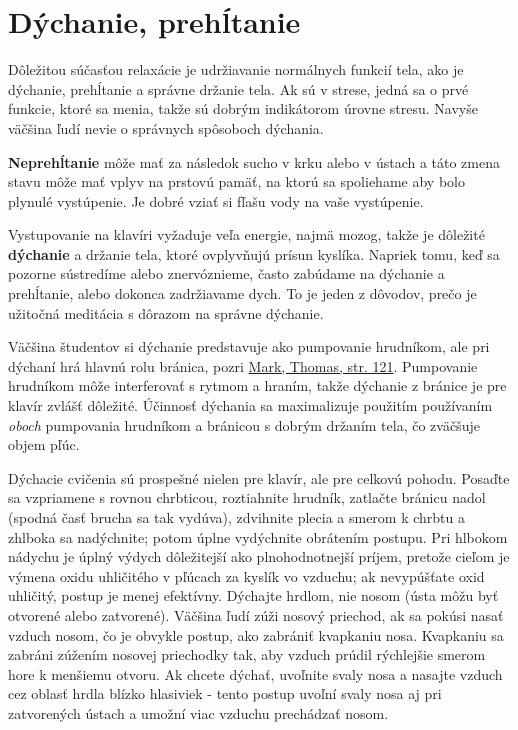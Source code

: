\documentclass[11pt,a4paper]{book}
\begin{document}
\section{Dýchanie, prehĺtanie}\label{s:breathing}
Dôležitou súčasťou relaxácie je udržiavanie normálnych funkcií tela, ako je dýchanie, prehĺtanie a správne držanie tela. Ak sú v strese, jedná sa o prvé funkcie, ktoré sa menia, takže sú dobrým indikátorom úrovne stresu. Navyše väčšina ľudí nevie o správnych spôsoboch dýchania.

\textbf{Neprehĺtanie} môže mať za následok sucho v krku alebo v ústach a táto zmena stavu môže mať vplyv na prstovú pamäť, na ktorú sa spoliehame aby bolo plynulé vystúpenie. Je dobré vziať si fľašu vody na vaše vystúpenie.

Vystupovanie na klavíri vyžaduje veľa energie, najmä mozog, takže je dôležité \textbf{dýchanie} a držanie tela, ktoré ovplyvňujú prísun kyslíka. Napriek tomu, keď sa pozorne sústredíme alebo znervóznieme, často zabúdame na dýchanie a prehĺtanie, alebo dokonca zadržiavame dych. To je jeden z dôvodov, prečo je užitočná meditácia s dôrazom na správne dýchanie.

Väčšina študentov si dýchanie predstavuje ako pumpovanie hrudníkom, ale pri dýchaní hrá hlavnú rolu bránica, pozri \hyperlink{r:mark}{Mark, Thomas, str. 121}. Pumpovanie hrudníkom môže interferovať s rytmom a hraním, takže dýchanie z bránice je pre klavír zvlášť dôležité. Účinnosť dýchania sa maximalizuje použitím používaním \textit{oboch} pumpovania hrudníkom a bránicou s dobrým držaním tela, čo zväčšuje objem pľúc.

Dýchacie cvičenia sú prospešné nielen pre klavír, ale pre celkovú pohodu. Posaďte sa vzpriamene s rovnou chrbticou, roztiahnite hrudník, zatlačte bránicu nadol (spodná časť brucha sa tak vydúva), zdvihnite plecia a smerom k chrbtu a zhlboka sa nadýchnite; potom úplne vydýchnite obrátením postupu. Pri hlbokom nádychu je úplný výdych dôležitejší ako plnohodnotnejší príjem, pretože cieľom je výmena oxidu uhličitého v pľúcach za kyslík vo vzduchu; ak nevypúšťate oxid uhličitý, postup je menej efektívny. Dýchajte hrdlom, nie nosom (ústa môžu byť otvorené alebo zatvorené). Väčšina ľudí zúži nosový priechod, ak sa pokúsi nasať vzduch nosom, čo je obvykle postup, ako zabrániť kvapkaniu nosa. Kvapkaniu sa zabráni zúžením nosovej priechodky tak, aby vzduch prúdil rýchlejšie smerom hore k menšiemu otvoru. Ak chcete dýchať, uvoľnite svaly nosa a nasajte vzduch cez oblasť hrdla blízko hlasiviek - tento postup uvoľní svaly nosa aj pri zatvorených ústach a umožní viac vzduchu prechádzať nosom.
\end{document}
